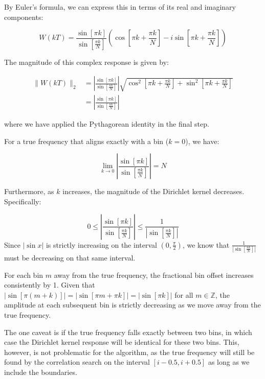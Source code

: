 \documentclass[11pt,twoside]{report}
\numberwithin{thm}{section}
\numberwithin{equation}{section}
\begin{document}
By Euler's formula, we can express this in terms of its real and imaginary components:

\begin{equation}
\label{eq:dirichlet_complex}
W(kT) = \frac{\sin\left[\pi k\right]}{\sin\left[\frac{\pi k}{N}\right]}\left(\cos\left[\pi k + \frac{\pi k}{N}\right] - i\sin\left[\pi k + \frac{\pi k}{N}\right]\right)
\end{equation}

The magnitude of this complex response is given by:

\begin{align}
\label{eq:dirichlet_magnitude}
\|W(kT)\|_2 &= \left|\frac{\sin\left[\pi k\right]}{\sin\left[\frac{\pi k}{N}\right]}\right| \sqrt{\cos^2\left[\pi k + \frac{\pi k}{N}\right] + \sin^2\left[\pi k + \frac{\pi k}{N}\right]} \\
&= \left|\frac{\sin\left[\pi k\right]}{\sin\left[\frac{\pi k}{N}\right]}\right|
\end{align}

where we have applied the Pythagorean identity in the final step.

For a true frequency that aligns exactly with a bin ($k = 0$), we have:

\begin{equation}
\label{eq:dirichlet_at_zero}
\lim_{k\to 0} \left|\frac{\sin\left[\pi k\right]}{\sin\left[\frac{\pi k}{N}\right]}\right| = N
\end{equation}

Furthermore, as $k$ increases, the magnitude of the Dirichlet kernel decreases. Specifically:

\begin{equation}
\label{eq:dirichlet_bounds}
0 \leq \left|\frac{\sin\left[\pi k\right]}{\sin\left[\frac{\pi k}{N}\right]}\right| \leq \frac{1}{\left|\sin\left[\frac{\pi k}{N}\right]\right|}
\end{equation}
Since $|\sin x|$ is strictly increasing on the interval $(0, \frac{\pi}{2})$, we know that $\frac{1}{\left|\sin\left[\frac{\pi k}{N}\right]\right|}$ must be decreasing on that same interval.

For each bin $m$ away from the true frequency, the fractional bin offset increases consistently by 1. Given that $|\sin[\pi(m + k)]| = |\sin[\pi m + \pi k]| = |\sin[\pi k]|$ for all $m \in \mathbb{Z}$, the amplitude at each subsequent bin is strictly decreasing as we move away from the true frequency.

The one caveat is if the true frequency falls exactly between two bins, in which case the Dirichlet kernel response will be identical for these two bins. This, however, is not problematic for the algorithm, as the true frequency will still be found by the correlation search on the interval $[i-0.5, i+0.5]$ as long as we include the boundaries.
\end{document}
